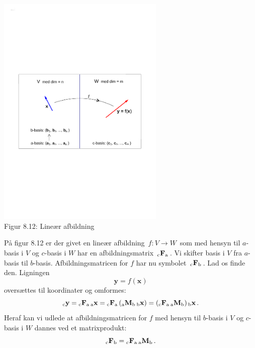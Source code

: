 \begin{center}
		\includegraphics[trim=2cm 9cm 2cm
 9cm,width=0.60\textwidth,clip]{linAfbVW2.pdf}
  \\Figur 8.12: Lineær afbildning 
\end{center}

På figur 8.12 er der givet en lineær afbildning $\,f:V\rightarrow W\,$ som med hensyn til $a$-basis i $V$ og $c$-basis i $W$ har en afbildningsmatrix $\,{_\mathrm{c}\mathbf{F}_\mathrm{a}}\,$. Vi skifter basis i $V$ fra $a$-basis til $b$-basis. Afbildningsmatricen for $f$ har nu symbolet $\,{_\mathrm{c}\mathbf{F}_\mathrm{b}}\,$. Lad os finde den. Ligningen
$$
\mathbf y = f(\mathbf x)$$
oversættes til koordinater og omformes:
$$
{_\mathrm{c}\mathbf{y}} ={_\mathrm{c}\mathbf{F}_\mathrm{a}}\,{_\mathrm{a}\mathbf{x}}
={_\mathrm{c}\mathbf{F}_\mathrm{a}}\,({_\mathrm{a}\mathbf{M}_\mathrm{b}}\,{_\mathrm{b}\mathbf{x}})
=({_\mathrm{c}\mathbf{F}_\mathrm{a}}\,{_\mathrm{a}\mathbf{M}_\mathrm{b}})\,{_\mathrm{b}\mathbf{x}} \,.
$$
Heraf kan vi udlede at afbildningsmatricen for $f$ med hensyn til $b$-basis i $V$ og $c$-basis i $W$ dannes ved et matrixprodukt:
\begin{equation}%
 \matind cFb=\matind cFa\,\matind aMb\,.
\end{equation}

